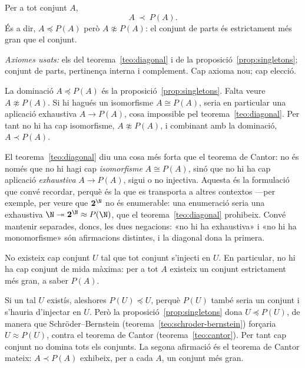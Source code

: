 \begin{teorema}[Cantor]\label{teo:cantor}
Per a tot conjunt \(A\),
\[
A\ \prec\ P(A).
\]
És a dir, \(A\preceq P(A)\) però \(A\not\approx P(A)\): el conjunt de parts
és estrictament més gran que el conjunt.\par
\emph{Axiomes usats:} els del teorema~\ref{teo:diagonal} i de la
proposició~\ref{prop:singletons}; conjunt de parts, pertinença interna i
complement. Cap axioma nou; cap elecció.
\end{teorema}

\begin{prova}
La dominació \(A\preceq P(A)\) és la proposició~\ref{prop:singletons}. Falta
veure \(A\not\approx P(A)\). Si hi hagués un isomorfisme \(A\cong P(A)\),
seria en particular una aplicació exhaustiva \(A\to P(A)\), cosa impossible
pel teorema~\ref{teo:diagonal}. Per tant no hi ha cap isomorfisme, \(A\not
\approx P(A)\), i combinant amb la dominació, \(A\prec P(A)\).
\end{prova}

\begin{observacio}\label{obs:cantor-fort}
El teorema~\ref{teo:diagonal} diu una cosa més forta que el teorema de
Cantor: no és només que no hi hagi cap \emph{isomorfisme} \(A\cong P(A)\),
sinó que no hi ha cap aplicació \emph{exhaustiva} \(A\to P(A)\), sigui o no
injectiva. Aquesta és la formulació que convé recordar, perquè és la que es
transporta a altres contextos ---per exemple, per veure que \(\mathbf2^{\N}\)
no és enumerable: una enumeració seria una exhaustiva
\(\N\twoheadrightarrow\mathbf2^{\N}\approx P(\N)\), que el
teorema~\ref{teo:diagonal} prohibeix. Convé mantenir separades, doncs, les
dues negacions: «no hi ha exhaustiva» i «no hi ha monomorfisme» són
afirmacions distintes, i la diagonal dona la primera.
\end{observacio}

\begin{corollari}\label{cor:no-universal}
No existeix cap conjunt \(U\) tal que tot conjunt s'injecti en \(U\). En
particular, no hi ha cap conjunt de mida màxima: per a tot \(A\) existeix un
conjunt estrictament més gran, a saber \(P(A)\).
\end{corollari}

\begin{prova}
Si un tal \(U\) existís, aleshores \(P(U)\preceq U\), perquè \(P(U)\) també
seria un conjunt i s'hauria d'injectar en \(U\). Però la
proposició~\ref{prop:singletons} dona \(U\preceq P(U)\), de manera que
Schröder--Bernstein (teorema~\ref{teo:schroder-bernstein}) forçaria
\(U\approx P(U)\), contra el teorema de Cantor
(teorema~\ref{teo:cantor}). Per tant cap conjunt no domina tots els
conjunts. La segona afirmació és el teorema de Cantor mateix:
\(A\prec P(A)\) exhibeix, per a cada \(A\), un conjunt més gran.
\end{prova}

